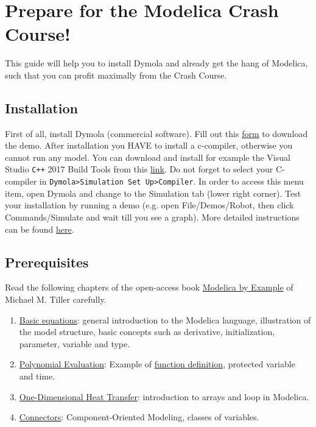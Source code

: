 \documentclass[10pt,a4paper]{article}
\author{Bram van der Heijde}
\begin{document}
\section*{Prepare for the Modelica Crash Course!}

This guide will help you to install Dymola and already get the hang of Modelica, such that you can profit maximally from the Crash Course. 

\subsection*{Installation}

First of all, install Dymola (commercial software).  Fill out this 
\href{http://www.claytex.com/products/dymola/dymola-demo/}{form} to download 
the demo. After installation you HAVE to install a c-compiler, otherwise you 
cannot run any model.  You can download and install for example the Visual 
Studio \texttt{C++} 2017 Build Tools from this  
\href{https://visualstudio.microsoft.com/thank-you-downloading-visual-studio/?sku=BuildTools&rel=15}{link}.
Do not forget to select your C-compiler in \texttt{Dymola>Simulation Set 
Up>Compiler}. 
In order to access this menu item, open Dymola and change to the Simulation tab 
(lower right corner).
Test your installation by running a demo (e.g. open File/Demos/Robot, then 
click Commands/Simulate and wait till you see a graph). 
More detailed 
instructions can be found 
\href{https://www.3ds.com/fileadmin/PRODUCTS/CATIA/DYMOLA/PDF/Installation.pdf}{here}.

\subsection*{Prerequisites}
Read the following chapters of the open-access book  
\href{http://book.xogeny.com/}{Modelica by Example} of Michael M. Tiller 
carefully.

\begin{enumerate}
\item \href{http://book.xogeny.com/behavior/equations/}{Basic equations}: general introduction to the Modelica language, illustration of the model structure, basic concepts such as derivative, initialization, parameter, variable and type.
\item \href{http://book.xogeny.com/behavior/functions/polynomial/}{Polynomial 
Evaluation}: Example of 
\href{http://book.xogeny.com/behavior/functions/func_def/}{function 
definition}, protected variable and time.
\item \href{http://book.xogeny.com/behavior/arrays/oned/}{One-Dimensional Heat Transfer}: introduction to arrays and loop in Modelica.
\item	\href{http://book.xogeny.com/components/connectors/}{Connectors}: Component-Oriented Modeling, classes of variables.



\end{enumerate}
\end{document}
